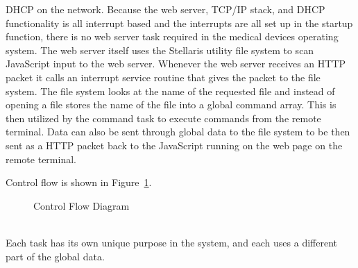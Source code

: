 \documentclass[12pt]{article} %
\begin{document}
DHCP on the network. Because the web server, TCP/IP stack, and DHCP functionality is all interrupt based and the interrupts are all set up in the startup function, there is no web server task required in the
medical devices operating system. The web server itself uses the Stellaris utility file system to scan JavaScript input to the web server. Whenever the web server receives an HTTP packet it calls an interrupt service routine that gives the packet to the file system.
The file system looks at the name of the requested file and instead of opening a file stores the name of the file into a global command array. 
This is then utilized by the command task to execute commands from the remote terminal. Data can also be sent through global data to the file system to be then sent as a HTTP packet back to the JavaScript running on the web page on the remote terminal.
    
    Control flow is shown in Figure~\ref{fig:Control}. 

    \begin{figure}[h]
      \centering
      \caption{Control Flow Diagram}
      \label{fig:Control}
    \end{figure}
~\\
    Each task has its own unique purpose in the system, and each uses a different
    part of the global data.
\end{document}
